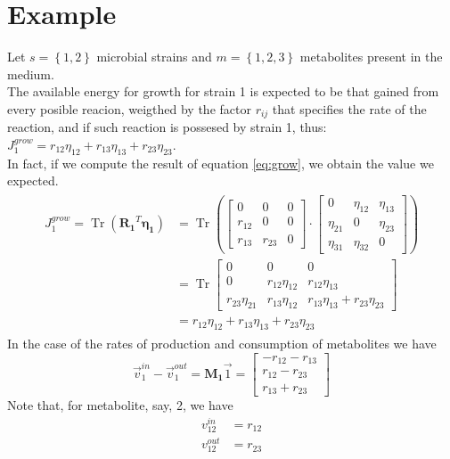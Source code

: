 \documentclass{article}
\DeclareMathOperator{\Tr}{Tr}
\begin{document}
	\section{Example}
		Let $  s = \left\{1, 2\right\}  $ microbial strains and $  m = \left\{1,2,3\right\}  $ metabolites present in the medium. \\
		The available energy for growth for strain 1 is expected to be that gained from every posible reacion, weigthed by the factor $ r_{ij} $ that specifies the rate of the reaction, and if such reaction is possesed by strain 1, thus: $ J_1^{grow} = r_{12}\eta_{12} + r_{13}\eta_{13} + r_{23}\eta_{23} $. \\
		In fact, if we compute the result of equation \ref{eq:grow}, we obtain the  value we expected.
	\begin{multline}
		\begin{split}
			J_1^{grow} = \Tr\left(\boldsymbol{R_1}^T\boldsymbol{\eta_1}\right) &= \Tr \left(\begin{bmatrix} 
			0 & 0 &  0 \\
			r_{12} & 0 & 0 \\
			r_{13} &  r_{23} & 0 
			\end{bmatrix} \cdot 
			\begin{bmatrix} 
			0 & \eta_{12} & \eta_{13} \\
			\eta_{21} & 0 & \eta_{23} \\
			\eta_{31} & \eta_{32} & 0
			\end{bmatrix}\right) \\
			&= \Tr \begin{bmatrix} 
			0 & 0 & 0 \\
			0 &  r_{12}\eta_{12} & r_{12}\eta_{13} \\
			r_{23}\eta_{21} & r_{13}\eta_{12} & r_{13}\eta_{13} + r_{23}\eta_{23} 
			\end{bmatrix} \\ &=  r_{12}\eta_{12} + r_{13}\eta_{13} + r_{23}\eta_{23} 
		\end{split}
	\end{multline}
		In the case of the rates of production and consumption of metabolites we have
	\begin{equation}
		\vec{v}_{1}^{in} - \vec{v}_{1}^{out}  = \boldsymbol{M_1}\vec{1} =  \begin{bmatrix}
		-r_{12} -  r_{13} \\
		r_{12} - r_{23} \\
		r_{13} + r_{23}
		\end{bmatrix}
	\end{equation}
		Note that, for metabolite, say, 2, we have
		\begin{equation}
		\begin{split}
		v_{12}^{in} &= r_{12}\\
		v_{12}^{out} &= r_{23}
		\end{split}
		\end{equation}
\end{document}
